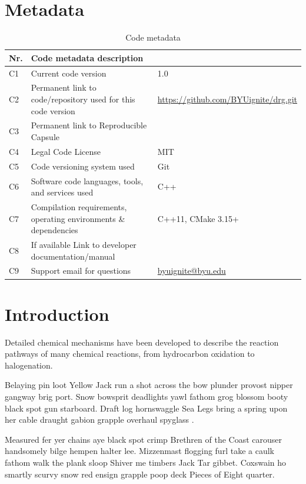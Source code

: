 \documentclass[preprint,12pt, a4paper]{elsarticle}
\begin{document}
\section*{Metadata}
\label{s:Metadata}
%
\begin{table}[!ht]
\begin{tabular}{|l|p{6.5cm}|p{6.5cm}|}
\hline
\textbf{Nr.} & \textbf{Code metadata description} & \\
\hline
C1 & Current code version & 1.0 \\
\hline
C2 & Permanent link to code/repository used for this code version & \url{https://github.com/BYUignite/drg.git} \\
\hline
C3  & Permanent link to Reproducible Capsule & \\
\hline
C4 & Legal Code License   & MIT \\
\hline
C5 & Code versioning system used & Git \\
\hline
C6 & Software code languages, tools, and services used & C++ \\
\hline
C7 & Compilation requirements, operating environments \& dependencies & C++11, CMake 3.15+\\
\hline
C8 & If available Link to developer documentation/manual & \\
\hline
C9 & Support email for questions & \href{mailto: davidlignell@byu.edu}{byuignite@byu.edu}\\
\hline
\end{tabular}
\caption{Code metadata}
\label{codeMetadata} 
\end{table}

\section{Introduction}      \label{sec:intro}

Detailed chemical mechanisms have been developed to describe the reaction pathways of many chemical reactions, from hydrocarbon oxidation to halogenation. 

Belaying pin loot Yellow Jack run a shot across the bow plunder provost nipper gangway brig port. Snow bowsprit deadlights yawl \cite{Lignell_2011} fathom grog blossom booty black spot gun starboard. Draft log hornswaggle Sea Legs bring a spring upon her cable draught gabion grapple overhaul spyglass \cite{Ferziger_2002, Cantera_new}.

Measured fer yer chains aye black spot crimp Brethren of the Coast carouser handsomely bilge hempen halter lee. Mizzenmast flogging furl take a caulk fathom walk the plank sloop Shiver me timbers Jack Tar gibbet. Coxswain ho smartly scurvy snow red ensign grapple poop deck Pieces of Eight quarter.
\end{document}
